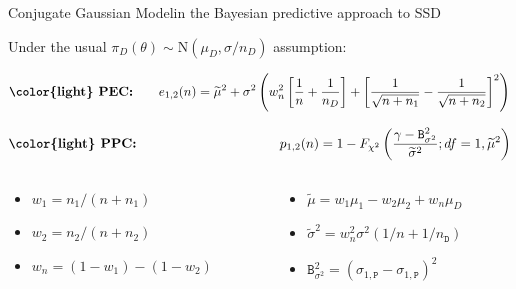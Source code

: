 \documentclass[9 pt]{beamer}
\begin{document}
\begin{frame}{Conjugate Gaussian Model}{in the Bayesian predictive approach to SSD}

Under the usual $\pi_D(\theta)\sim \text{N}(\mu_D, \sigma/n_D)$ assumption: 

\vspace{0.25cm}

\pause
 \[\text{\bf \color{light} PEC:}\qquad  e_{1,2}(n) = \widetilde{\mu}^{2} + \sigma^{2}\left(w_{n}^{2}\left[\frac{1}{n} + \frac{1}{n_{D}}\right] + \left[\frac{1}{\sqrt{n + n_{1}}} - \frac{1}{\sqrt{n + n_{2}}}\right]^{2}\right)\]

\pause
\vspace{0.5cm}

        \[\text{\bf \color{light} PPC:}\qquad\qquad\qquad \qquad \;\;\; \qquad p_{1,2}(n) =  1 - F_{\chi^2}\left(\frac{\gamma - \mathtt{B}^{2}_{\sigma^{2}}}{\widetilde{\sigma}^{2}}; df = 1, \widetilde{\mu}^2 \right)\]


\begin{columns}

\begin{column}{0.48\textwidth}
\begin{itemize}
    \item $w_{1} = n_{1}/(n + n_{1})$
    \item $w_{2} = n_{2}/(n + n_{2})$ 
    \item $w_{n} = (1-w_1) - (1-w_2)$
\end{itemize}


\end{column}


\begin{column}{0.48\textwidth}
\begin{itemize}
    \item $\widetilde{\mu} = w_{1}\mu_{1} - w_{2}\mu_{2} + w_{n}\mu_{D}$
    \item $\widetilde{\sigma}^{2} = w_{n}^{2}\sigma^{2}(1/n + 1/n_{\mathtt{D}})$
    \item $\mathtt{B}^{2}_{\sigma^{2}} = \left(\sigma_{1,\mathtt{P}} - \sigma_{1,\mathtt{P}} \right)^2$
\end{itemize}


\end{column}

\end{columns}

\end{frame}
\end{document}
